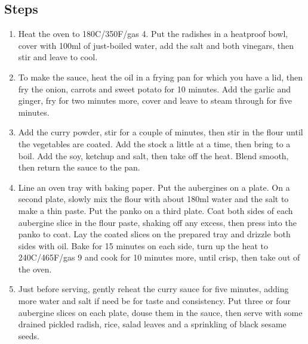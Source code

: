 \documentclass{book}
\begin{document}
\subsection*{Steps}
\begin{enumerate}
\item Heat the oven to 180C/350F/gas 4. Put the radishes in a heatproof bowl, cover with 100ml of just-boiled water, add the salt and both vinegars, then stir and leave to cool.
\item To make the sauce, heat the oil in a frying pan for which you have a lid, then fry the onion, carrots and sweet potato for 10 minutes. Add the garlic and ginger, fry for two minutes more, cover and leave to steam through for five minutes.
\item Add the curry powder, stir for a couple of minutes, then stir in the flour until the vegetables are coated. Add the stock a little at a time, then bring to a boil. Add the soy, ketchup and salt, then take off the heat. Blend smooth, then return the sauce to the pan.
\item Line an oven tray with baking paper. Put the aubergines on a plate. On a second plate, slowly mix the flour with about 180ml water and the salt to make a thin paste. Put the panko on a third plate. Coat both sides of each aubergine slice in the flour paste, shaking off any excess, then press into the panko to coat. Lay the coated slices on the prepared tray and drizzle both sides with oil. Bake for 15 minutes on each side, turn up the heat to 240C/465F/gas 9 and cook for 10 minutes more, until crisp, then take out of the oven.
\item Just before serving, gently reheat the curry sauce for five minutes, adding more water and salt if need be for taste and consistency. Put three or four aubergine slices on each plate, douse them in the sauce, then serve with some drained pickled radish, rice, salad leaves and a sprinkling of black sesame seeds.
\end{enumerate}
\newpage
\end{document}
